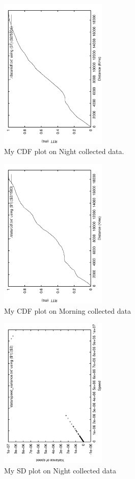 \documentclass[twocolumn]{article}
\begin{document}
\begin{figure}
\centering
\includegraphics[width=2in,angle=270]{cdfplot_night.pdf}
\caption{My CDF plot on Night collected data.}
\label{figure:cdf_night}
\end{figure}

\begin{figure}
\centering
\includegraphics[width=2in,angle=270]{cdfplot_morning.pdf}
\caption{My CDF plot on Morning collected data}
\label{figure:cdf_morning}
\end{figure}

\begin{figure}
\centering
\includegraphics[width=2in,angle=270]{speed_sd_plot_night.pdf}
\caption{My SD plot on Night collected data}
\label{figure:sd_night}
\end{figure}
\end{document}
